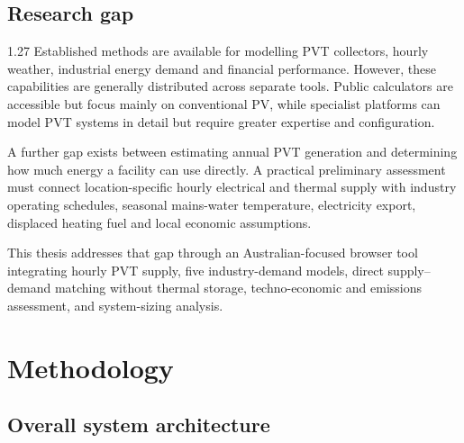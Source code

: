 \documentclass[12pt,letterpaper]{article}
\newcommand{\done}{\ \textcolor{green!45!black}{$\checkmark$}} %
\begin{document}
\subsection[Research gap\done]{Research gap}\label{sec16}

\begin{spacing}{1.27}
Established methods are available for modelling PVT collectors, hourly weather, industrial energy demand and financial performance. However, these capabilities are generally distributed across separate tools. Public calculators are accessible but focus mainly on conventional PV, while specialist platforms can model PVT systems in detail but require greater expertise and configuration.\par

\vspace{0.15in}

A further gap exists between estimating annual PVT generation and determining how much energy a facility can use directly. A practical preliminary assessment must connect location-specific hourly electrical and thermal supply with industry operating schedules, seasonal mains-water temperature, electricity export, displaced heating fuel and local economic assumptions.\par

\vspace{0.15in}

This thesis addresses that gap through an Australian-focused browser tool integrating hourly PVT supply, five industry-demand models, direct supply--demand matching without thermal storage, techno-economic and emissions assessment, and system-sizing analysis.\par
\end{spacing}

\clearpage

\section{Methodology}\label{sec17}

\subsection[Overall system architecture\done]{Overall system architecture}\label{sec18}
\end{document}
